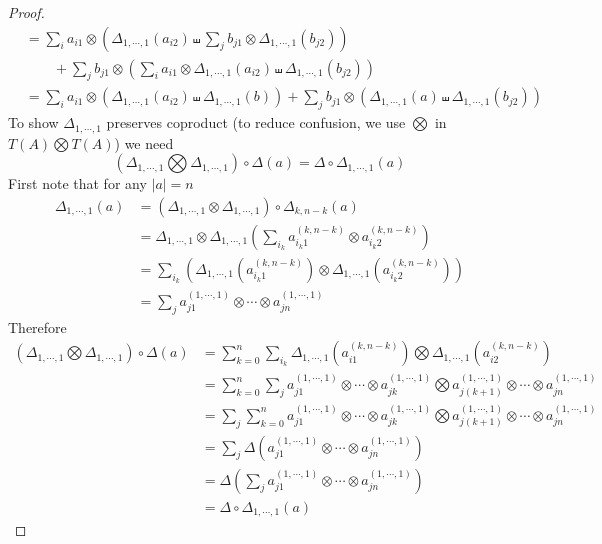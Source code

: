 \begin{proof}
\begin{align*}
&=\sum_{i}a_{i1}\otimes\left(\Delta_{1,\cdots,1}(a_{i2})\shuffle\sum_jb_{j1}\otimes\Delta_{1,\cdots,1}(b_{j2})\right)\\
&\qquad+\sum_jb_{j1}\otimes\left(\sum_ia_{i1}\otimes\Delta_{1,\cdots,1}(a_{i2})\shuffle\Delta_{1,\cdots,1}(b_{j2})\right)\\
&=\sum_{i}a_{i1}\otimes(\Delta_{1,\cdots,1}(a_{i2})\shuffle\Delta_{1,\cdots,1}(b))+\sum_jb_{j1}\otimes(\Delta_{1,\cdots,1}(a)\shuffle\Delta_{1,\cdots,1}(b_{j2}))
\end{align*}
To show $\Delta_{1,\cdots,1}$ preserves coproduct (to reduce confusion, we use $\bigotimes$ in $T(A)\bigotimes T(A)$) we need
\begin{equation}
(\Delta_{1,\cdots,1}\bigotimes\Delta_{1,\cdots,1})\circ\Delta(a)=\Delta\circ\Delta_{1,\cdots,1}(a)
\end{equation}
First note that for any $|a|=n$
\begin{align*}
\Delta_{1,\cdots,1}(a)&=(\Delta_{1,\cdots,1}\otimes\Delta_{1,\cdots,1})\circ\Delta_{k,n-k}(a)\\
&=\Delta_{1,\cdots,1}\otimes\Delta_{1,\cdots,1}\left(\sum_{i_k}a^{(k,n-k)}_{i_k1}\otimes a^{(k,n-k)}_{i_k2}\right)\\
&=\sum_{i_k}\left(\Delta_{1,\cdots,1}\left(a^{(k,n-k)}_{i_k1}\right)\otimes\Delta_{1,\cdots,1}\left(a^{(k,n-k)}_{i_k2}\right)\right)\\
&=\sum_ja^{(1,\cdots,1)}_{j1}\otimes\cdots\otimes a^{(1,\cdots,1)}_{jn}
\end{align*}
Therefore
\begin{align*}
(\Delta_{1,\cdots,1}\bigotimes\Delta_{1,\cdots,1})\circ\Delta(a)&=\sum_{k=0}^n\sum_{i_k}\Delta_{1,\cdots,1}\left(a^{(k,n-k)}_{i1}\right)\bigotimes\Delta_{1,\cdots,1}\left(a^{(k,n-k)}_{i2}\right)\\
&=\sum_{k=0}^n\sum_ja^{(1,\cdots,1)}_{j1}\otimes\cdots\otimes a^{(1,\cdots,1)}_{jk}\bigotimes a^{(1,\cdots,1)}_{j(k+1)}\otimes\cdots\otimes a^{(1,\cdots,1)}_{jn}\\
&=\sum_j\sum_{k=0}^na^{(1,\cdots,1)}_{j1}\otimes\cdots\otimes a^{(1,\cdots,1)}_{jk}\bigotimes a^{(1,\cdots,1)}_{j(k+1)}\otimes\cdots\otimes a^{(1,\cdots,1)}_{jn}\\
&=\sum_j\Delta\left(a^{(1,\cdots,1)}_{j1}\otimes\cdots\otimes a^{(1,\cdots,1)}_{jn}\right)\\
&=\Delta\left(\sum_ja^{(1,\cdots,1)}_{j1}\otimes\cdots\otimes a^{(1,\cdots,1)}_{jn}\right)\\
&=\Delta\circ\Delta_{1,\cdots,1}(a)
\end{align*}
\end{proof}

